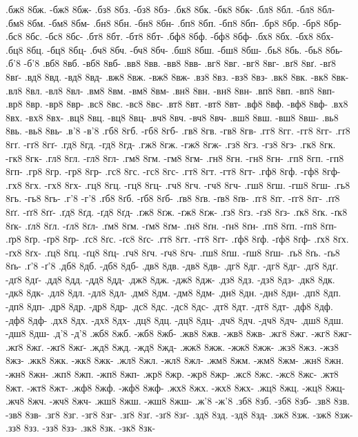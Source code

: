 {.бж8 8бж. -бж8 8бж-
.бз8 8бз. -бз8 8бз-
.бк8 8бк. -бк8 8бк-
.бл8 8бл. -бл8 8бл-
.бм8 8бм. -бм8 8бм-
.бн8 8бн. -бн8 8бн-
.бп8 8бп. -бп8 8бп-
.бр8 8бр. -бр8 8бр-
.бс8 8бс. -бс8 8бс-
.бт8 8бт. -бт8 8бт-
.бф8 8бф. -бф8 8бф-
.бх8 8бх. -бх8 8бх-
.бц8 8бц. -бц8 8бц-
.бч8 8бч. -бч8 8бч-
.бш8 8бш. -бш8 8бш-
.бь8 8бь. -бь8 8бь-
.б'8 -б'8
.вб8 8вб. -вб8 8вб-
.вв8 8вв. -вв8 8вв-
.вг8 8вг. -вг8 8вг-
.вґ8 8вґ. -вґ8 8вґ-
.вд8 8вд. -вд8 8вд-
.вж8 8вж. -вж8 8вж-
.вз8 8вз. -вз8 8вз-
.вк8 8вк. -вк8 8вк-
.вл8 8вл. -вл8 8вл-
.вм8 8вм. -вм8 8вм-
.вн8 8вн. -вн8 8вн-
.вп8 8вп. -вп8 8вп-
.вр8 8вр. -вр8 8вр-
.вс8 8вс. -вс8 8вс-
.вт8 8вт. -вт8 8вт-
.вф8 8вф. -вф8 8вф-
.вх8 8вх. -вх8 8вх-
.вц8 8вц. -вц8 8вц-
.вч8 8вч. -вч8 8вч-
.вш8 8вш. -вш8 8вш-
.вь8 8вь. -вь8 8вь-
.в'8 -в'8
.гб8 8гб. -гб8 8гб-
.гв8 8гв. -гв8 8гв-
.гг8 8гг. -гг8 8гг-
.гґ8 8гґ. -гґ8 8гґ-
.гд8 8гд. -гд8 8гд-
.гж8 8гж. -гж8 8гж-
.гз8 8гз. -гз8 8гз-
.гк8 8гк. -гк8 8гк-
.гл8 8гл. -гл8 8гл-
.гм8 8гм. -гм8 8гм-
.гн8 8гн. -гн8 8гн-
.гп8 8гп. -гп8 8гп-
.гр8 8гр. -гр8 8гр-
.гс8 8гс. -гс8 8гс-
.гт8 8гт. -гт8 8гт-
.гф8 8гф. -гф8 8гф-
.гх8 8гх. -гх8 8гх-
.гц8 8гц. -гц8 8гц-
.гч8 8гч. -гч8 8гч-
.гш8 8гш. -гш8 8гш-
.гь8 8гь. -гь8 8гь-
.г'8 -г'8
.ґб8 8ґб. -ґб8 8ґб-
.ґв8 8ґв. -ґв8 8ґв-
.ґг8 8ґг. -ґг8 8ґг-
.ґґ8 8ґґ. -ґґ8 8ґґ-
.ґд8 8ґд. -ґд8 8ґд-
.ґж8 8ґж. -ґж8 8ґж-
.ґз8 8ґз. -ґз8 8ґз-
.ґк8 8ґк. -ґк8 8ґк-
.ґл8 8ґл. -ґл8 8ґл-
.ґм8 8ґм. -ґм8 8ґм-
.ґн8 8ґн. -ґн8 8ґн-
.ґп8 8ґп. -ґп8 8ґп-
.ґр8 8ґр. -ґр8 8ґр-
.ґс8 8ґс. -ґс8 8ґс-
.ґт8 8ґт. -ґт8 8ґт-
.ґф8 8ґф. -ґф8 8ґф-
.ґх8 8ґх. -ґх8 8ґх-
.ґц8 8ґц. -ґц8 8ґц-
.ґч8 8ґч. -ґч8 8ґч-
.ґш8 8ґш. -ґш8 8ґш-
.ґь8 8ґь. -ґь8 8ґь-
.ґ'8 -ґ'8
.дб8 8дб. -дб8 8дб-
.дв8 8дв. -дв8 8дв-
.дг8 8дг. -дг8 8дг-
.дґ8 8дґ. -дґ8 8дґ-
.дд8 8дд. -дд8 8дд-
.дж8 8дж. -дж8 8дж-
.дз8 8дз. -дз8 8дз-
.дк8 8дк. -дк8 8дк-
.дл8 8дл. -дл8 8дл-
.дм8 8дм. -дм8 8дм-
.дн8 8дн. -дн8 8дн-
.дп8 8дп. -дп8 8дп-
.др8 8др. -др8 8др-
.дс8 8дс. -дс8 8дс-
.дт8 8дт. -дт8 8дт-
.дф8 8дф. -дф8 8дф-
.дх8 8дх. -дх8 8дх-
.дц8 8дц. -дц8 8дц-
.дч8 8дч. -дч8 8дч-
.дш8 8дш. -дш8 8дш-
.д'8 -д'8
.жб8 8жб. -жб8 8жб-
.жв8 8жв. -жв8 8жв-
.жг8 8жг. -жг8 8жг-
.жґ8 8жґ. -жґ8 8жґ-
.жд8 8жд. -жд8 8жд-
.жж8 8жж. -жж8 8жж-
.жз8 8жз. -жз8 8жз-
.жк8 8жк. -жк8 8жк-
.жл8 8жл. -жл8 8жл-
.жм8 8жм. -жм8 8жм-
.жн8 8жн. -жн8 8жн-
.жп8 8жп. -жп8 8жп-
.жр8 8жр. -жр8 8жр-
.жс8 8жс. -жс8 8жс-
.жт8 8жт. -жт8 8жт-
.жф8 8жф. -жф8 8жф-
.жх8 8жх. -жх8 8жх-
.жц8 8жц. -жц8 8жц-
.жч8 8жч. -жч8 8жч-
.жш8 8жш. -жш8 8жш-
.ж'8 -ж'8
.зб8 8зб. -зб8 8зб-
.зв8 8зв. -зв8 8зв-
.зг8 8зг. -зг8 8зг-
.зґ8 8зґ. -зґ8 8зґ-
.зд8 8зд. -зд8 8зд-
.зж8 8зж. -зж8 8зж-
.зз8 8зз. -зз8 8зз-
.зк8 8зк. -зк8 8зк-
}

